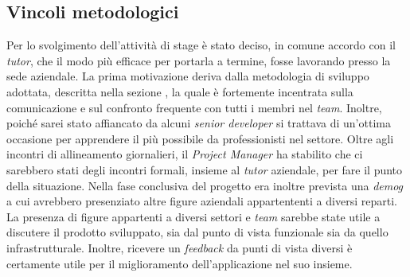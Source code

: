     \subsection{Vincoli metodologici}
        Per lo svolgimento dell'attività di stage è stato deciso, in comune accordo con il \textit{tutor}, che il modo più efficace per portarla a termine, fosse lavorando presso la sede aziendale. La prima motivazione deriva dalla metodologia di sviluppo adottata, descritta nella sezione , la quale è fortemente incentrata sulla comunicazione e sul confronto frequente con tutti i membri nel \textit{team}. Inoltre, poiché sarei stato affiancato da alcuni \textit{senior developer} si trattava di un'ottima occasione per apprendere il più possibile da professionisti nel settore.
        Oltre agli incontri di allineamento giornalieri, il \textit{Project Manager} ha stabilito che ci sarebbero stati degli incontri formali, insieme al \textit{tutor} aziendale, per fare il punto della situazione. Nella fase conclusiva del progetto era inoltre prevista una \textit{\gls{demog}} a cui avrebbero presenziato altre figure aziendali appartententi a diversi reparti.
        La presenza di figure appartenti a diversi settori e \textit{team} sarebbe state utile a discutere il prodotto sviluppato, sia dal punto di vista funzionale sia da quello infrastrutturale. Inoltre, ricevere un \textit{feedback} da punti di vista diversi è certamente utile per il miglioramento dell'applicazione nel suo insieme.
        
